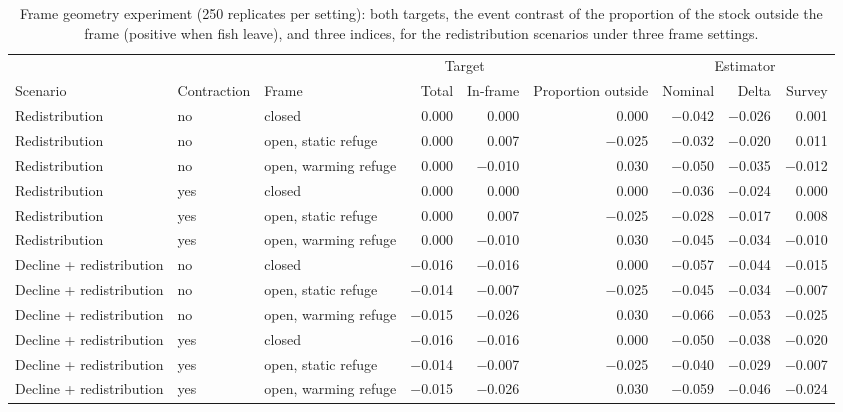 \documentclass[11pt,a4paper]{article}
\begin{document}
\begin{table}[htbp]
\centering\scriptsize
\setlength{\tabcolsep}{2.5pt}
\caption{Frame geometry experiment (250 replicates per setting): both targets, the event contrast of the proportion of the stock outside the frame (positive when fish leave), and three indices, for the redistribution scenarios under three frame settings.}
\label{tab:frame}
\begin{tabular}{@{}>{\raggedright\arraybackslash}p{2.6cm}ll rrrrrr@{}}
\toprule
 & & & \multicolumn{2}{c}{Target} & & \multicolumn{3}{c}{Estimator} \\
\cmidrule(lr){4-5}\cmidrule(l){7-9}
Scenario & Contraction & Frame & Total & In-frame & Proportion outside & Nominal & Delta & Survey \\
\midrule
Redistribution & no & closed & 0.000 & 0.000 & 0.000 & $-$0.042 & $-$0.026 & 0.001 \\
Redistribution & no & open, static refuge & 0.000 & 0.007 & $-$0.025 & $-$0.032 & $-$0.020 & 0.011 \\
Redistribution & no & open, warming refuge & 0.000 & $-$0.010 & 0.030 & $-$0.050 & $-$0.035 & $-$0.012 \\
Redistribution & yes & closed & 0.000 & 0.000 & 0.000 & $-$0.036 & $-$0.024 & 0.000 \\
Redistribution & yes & open, static refuge & 0.000 & 0.007 & $-$0.025 & $-$0.028 & $-$0.017 & 0.008 \\
Redistribution & yes & open, warming refuge & 0.000 & $-$0.010 & 0.030 & $-$0.045 & $-$0.034 & $-$0.010 \\
Decline + redistribution & no & closed & $-$0.016 & $-$0.016 & 0.000 & $-$0.057 & $-$0.044 & $-$0.015 \\
Decline + redistribution & no & open, static refuge & $-$0.014 & $-$0.007 & $-$0.025 & $-$0.045 & $-$0.034 & $-$0.007 \\
Decline + redistribution & no & open, warming refuge & $-$0.015 & $-$0.026 & 0.030 & $-$0.066 & $-$0.053 & $-$0.025 \\
Decline + redistribution & yes & closed & $-$0.016 & $-$0.016 & 0.000 & $-$0.050 & $-$0.038 & $-$0.020 \\
Decline + redistribution & yes & open, static refuge & $-$0.014 & $-$0.007 & $-$0.025 & $-$0.040 & $-$0.029 & $-$0.007 \\
Decline + redistribution & yes & open, warming refuge & $-$0.015 & $-$0.026 & 0.030 & $-$0.059 & $-$0.046 & $-$0.024 \\
\bottomrule
\end{tabular}
\end{table}
\end{document}
